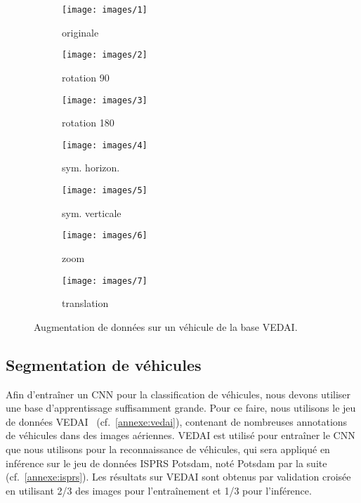 \begin{figure}[t]
	\begin{subfigure}{0.142\textwidth}
    	\texttt{[image: images/1]}
        \caption*{originale}
    \end{subfigure}%
    \begin{subfigure}{0.142\textwidth}
    	\texttt{[image: images/2]}
        \caption*{rotation 90\degre}
    \end{subfigure}%
    \begin{subfigure}{0.142\textwidth}
    	\texttt{[image: images/3]}
        \caption*{rotation 180\degre}
    \end{subfigure}%
    \begin{subfigure}{0.142\textwidth}
    	\texttt{[image: images/4]}
        \caption*{sym. horizon.}
    \end{subfigure}%
    \begin{subfigure}{0.142\textwidth}
    	\texttt{[image: images/5]}
        \caption*{sym. verticale}
    \end{subfigure}%
    \begin{subfigure}{0.142\textwidth}
    	\texttt{[image: images/6]}
        \caption*{zoom}
    \end{subfigure}%
    \begin{subfigure}{0.142\textwidth}
    	\texttt{[image: images/7]}
        \caption*{translation}
    \end{subfigure}
    \caption{Augmentation de données sur un véhicule de la base \gls{VEDAI}.}
    \label{fig:augmented_car}
\end{figure}

\subsection{Segmentation de véhicules}

Afin d'entraîner un \gls{CNN} pour la classification de véhicules, nous devons utiliser une base d'apprentissage suffisamment grande. Pour ce faire, nous utilisons le jeu de données \gls{VEDAI}~\cite{razakarivony_vehicle_2016} (cf.~\cref{annexe:vedai}), contenant de nombreuses annotations de véhicules dans des images aériennes. \gls{VEDAI} est utilisé pour entraîner le \gls{CNN} que nous utilisons pour la reconnaissance de véhicules, qui sera appliqué en inférence sur le jeu de données \gls{ISPRS} Potsdam, noté Potsdam par la suite (cf.~\cref{annexe:isprs}). Les résultats sur \gls{VEDAI} sont obtenus par validation croisée en utilisant 2/3 des images pour l'entraînement et 1/3 pour l'inférence.

